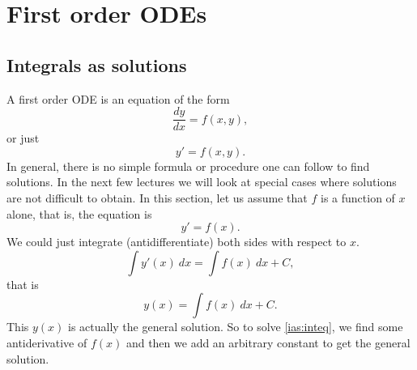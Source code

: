 \documentclass[12pt]{book}
\begin{document}

\chapter{First order ODEs} \label{fo:chapter}


\section{Integrals as solutions}
\label{integralsols:section}


A first order ODE is an equation of the form
\begin{equation*}
\frac{dy}{dx} = f(x,y) ,
\end{equation*}
or just
\begin{equation*}
y' = f(x,y) .
\end{equation*}
In general, there is no simple formula or procedure one can follow to find
solutions.
In the next few lectures we will look at special cases where solutions are not
difficult to obtain.
In this section, let us assume that $f$ is a function of $x$ alone,
that is, the equation is
\begin{equation} \label{ias:inteq}
y' = f(x) .
\end{equation}
We could just integrate (antidifferentiate) both sides with respect to $x$.
\begin{equation*}
\int y'(x) ~dx = \int f(x) ~dx + C ,
\end{equation*}
that is
\begin{equation*}
y(x) = \int f(x) ~dx + C .
\end{equation*}
This $y(x)$ is actually the general solution.
So to solve \eqref{ias:inteq},
we find some antiderivative of $f(x)$
and then we add an arbitrary constant to get the general solution.

\medskip
\end{document}
